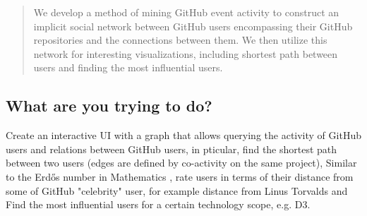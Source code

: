 \documentclass[sigconf,11pt]{acmart}
\begin{document}


\begin{abstract}
  We develop a method of mining GitHub event activity to construct an implicit social network
  between GitHub users encompassing their GitHub repositories and the connections between them.
  We then utilize this network for interesting visualizations, including shortest path between users
  and finding the most influential users.
\end{abstract}




\maketitle
\pagestyle{plain}

\subsection*{What are you trying to do?}
Create an interactive UI with a graph that allows querying the activity of GitHub users
and relations between GitHub users, in pticular, find the shortest path between two users
(edges are defined by co-activity on the same project),
Similar to the Erdős number in Mathematics \cite{wiki:erdos}, rate users in terms of their
distance from some of GitHub "celebrity" user, for example distance from Linus Torvalds
and Find the most influential users for a certain technology scope, e.g. D3.
\end{document}
